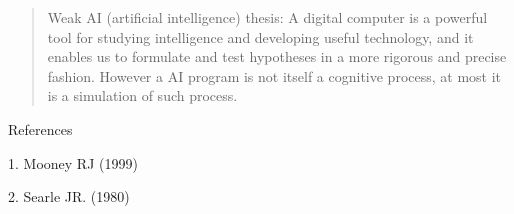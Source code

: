 \documentclass[12pt]{article}
\begin{document}
\begin{verse}Weak AI (artificial intelligence) thesis: A digital computer is a powerful tool for
studying intelligence and developing useful technology, and it enables us to formulate and test hypotheses in a more rigorous and precise fashion. However a  AI program is not itself a cognitive process, at most it is a simulation of such process.
\end{verse}

References

1. Mooney RJ (1999) 

2. Searle JR. (1980) 
\end{document}
